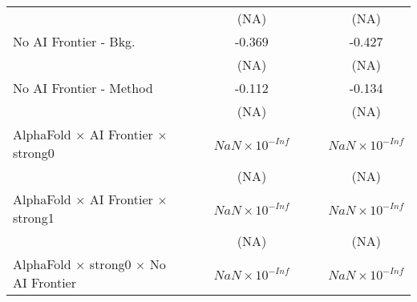 \begin{tabular}{lcccccc}
                                                                              &                        &                        & (NA)                   &                        &                        & (NA)\\   
   No AI Frontier - Bkg.                                                      &                        &                        & -0.369                 &                        &                        & -0.427\\   
                                                                              &                        &                        & (NA)                   &                        &                        & (NA)\\   
   No AI Frontier - Method                                                    &                        &                        & -0.112                 &                        &                        & -0.134\\   
                                                                              &                        &                        & (NA)                   &                        &                        & (NA)\\   
   AlphaFold $\times$ AI Frontier $\times$ strong0                            &                        &                        & $NaN\times 10^{-Inf}$  &                        &                        & $NaN\times 10^{-Inf}$\\    
                                                                              &                        &                        & (NA)                   &                        &                        & (NA)\\   
   AlphaFold $\times$ AI Frontier $\times$ strong1                            &                        &                        & $NaN\times 10^{-Inf}$  &                        &                        & $NaN\times 10^{-Inf}$\\    
                                                                              &                        &                        & (NA)                   &                        &                        & (NA)\\   
   AlphaFold $\times$ strong0 $\times$ No AI Frontier                         &                        &                        & $NaN\times 10^{-Inf}$  &                        &                        & $NaN\times 10^{-Inf}$\\    

\end{tabular}
